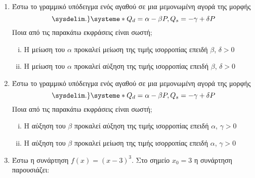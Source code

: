 


\everymath{\displaystyle}

\thispagestyle{empty}





\begin{center}
\end{center}

\vspace{\baselineskip}

\begin{enumerate}
    \item Έστω το γραμμικό υπόδειγμα ενός αγαθού σε μια μεμονωμένη αγορά της μορφής
        \[
        \sysdelim.\}\systeme*{Q_{d}= \alpha - \beta P,Q_{s}=- \gamma + \delta P} 
        \] 
        Ποια από τις παρακάτω εκφράσεις είναι σωστή;
        \begin{enumerate}[i)]
            \item Η μείωση του $\alpha$ προκαλεί μείωση της τιμής ισορροπίας επειδή $\beta$,
                $\delta > 0$ 
            \item Η μείωση του $\alpha$ προκαλεί αύξηση της τιμής ισορροπίας επειδή $\beta$,
                $\delta > 0$
        \end{enumerate}

    \item Έστω το γραμμικό υπόδειγμα ενός αγαθού σε μια μεμονωμένη αγορά της μορφής
        \[
        \sysdelim.\}\systeme*{Q_{d}= \alpha - \beta P,Q_{s}=- \gamma + \delta P} 
        \] 
        Ποια από τις παρακάτω εκφράσεις είναι σωστή;
        \begin{enumerate}[i)]
            \item Η αύξηση  του $\beta$ προκαλεί αύξηση της τιμής ισορροπίας επειδή $\alpha$,
                $\gamma > 0$ 
            \item Η αύξηση  του $\beta$ προκαλεί μείωση της τιμής ισορροπίας επειδή $\alpha$,
                $\gamma > 0$
        \end{enumerate}

    \item Έστω η συνάρτηση $ f(x) = (x-3)^{3} $. Στο σημείο $ x_{0} = 3 $ η συνάρτηση παρουσιάζει:



\end{enumerate}
